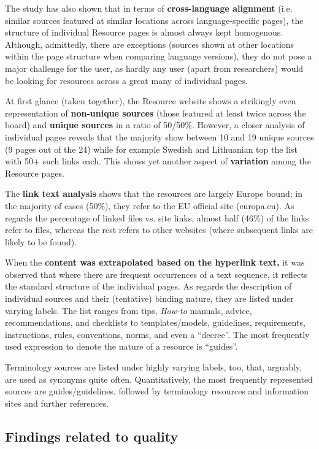 \documentclass[output=paper]{langsci/langscibook}
\begin{document}
The study has also shown that in terms of \textbf{cross-language alignment} (i.e. similar sources featured at similar locations across language-specific pages), the structure of individual Resource pages is almost always kept homogenous. Although, admittedly, there are exceptions (sources shown at other locations within the page structure when comparing language versions), they do not pose a major challenge for the user, as hardly any user (apart from researchers) would be looking for resources across a great many of individual pages.

At first glance (taken together), the Resource website shows a strikingly even representation of \textbf{non-unique sources} (those featured at least twice across the board) and \textbf{unique sources} in a ratio of 50/50\%. However, a closer analysis of individual pages reveals that the majority show between 10 and 19 unique sources (9 pages out of the 24) while for example Swedish and Lithuanian top the list with 50+ such links each. This shows yet another aspect of \textbf{variation} among the Resource pages.

The \textbf{link text analysis} shows that the resources are largely Europe bound; in the majority of cases (50\%), they refer to the EU official site (europa.eu). As regards the percentage of linked files vs. site links, almost half (46\%) of the links refer to files, whereas the rest refers to other websites (where subsequent links are likely to be found). 

When the \textbf{content was extrapolated based on the hyperlink text,} it was observed that where there are frequent occurrences of a text sequence, it reflects the standard structure of the individual pages. As regards the description of individual sources and their (tentative) binding nature, they are listed under varying labels. The list ranges from tips, \textit{How-to} manuals, advice, recommendations, and checklists to templates/models, guidelines, requirements, instructions, rules, conventions, norms, and even a “decree”. The most frequently used expression to denote the nature of a resource is “guides”.

Terminology sources are listed under highly varying labels, too, that, arguably, are used as synonyms quite often. Quantitatively, the most frequently represented sources are guides/guidelines, followed by terminology resources and information sites and further references.

\subsection{Findings related to quality}\label{sec:svoboda:5.2}
\end{document}
